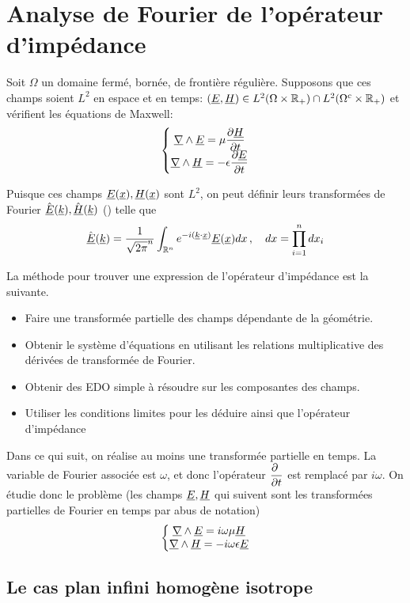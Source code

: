 \section{Analyse de Fourier de l'opérateur d'impédance}
Soit $\Omega$ un domaine fermé, bornée, de frontière régulière. Supposons que ces champs soient $L^2$ en espace et en temps: $(\E,\H) \in L^2(\Omega \times \R_+) \cap L^2(\Omega^c\times\R_+)$ et vérifient les équations de Maxwell:
\[
    \left\lbrace 
    \begin{matrix}
    \rot \E = \mu \dr{t}{\H} \\
    \rot \H = -\eps \dr{t}{\E}
    \end{matrix}
    \right.
\]

Puisque ces champs $\E(\v{x}),\H(\v{x})$ sont $L^2$, on peut définir leurs transformées de Fourier $\hat{\E}(\v{k}), \hat{\H}(\v{k})$ (\cite[Théorème de Plancherel, p.~153]{yosida_functional_1995}) telle que
\[
    \hat{\E} (\v{k}) = \frac{1}{\sqrt{2\pi}^n}\int_{\R^n} e^{-i(\v{k} \cdot \v{x})}\E(\v{x}) dx\,, \quad dx = \prod\limits_{i=1}^n dx_i
\]

La méthode pour trouver une expression de l'opérateur d'impédance est la suivante.
\begin{itemize}
\item Faire une transformée partielle des champs dépendante de la géométrie.
\item Obtenir le système d'équations en utilisant les relations multiplicative des dérivées de transformée de Fourier.
\item Obtenir des EDO simple à résoudre sur les composantes des champs.
\item Utiliser les conditions limites pour les déduire ainsi que l'opérateur d'impédance
\end{itemize}

Dans ce qui suit, on réalise au moins une transformée partielle en temps. La variable de Fourier associée est $\omega$, et donc l'opérateur $\dr{t}{~}$ est remplacé par $i\omega$. On étudie donc le problème (les champs $\E,\H$ qui suivent sont les transformées partielles de Fourier en temps par abus de notation)
\[
    \left\lbrace 
    \begin{matrix}
    \rot \E = i \omega \mu \H \\
    \rot \H = -i \omega \eps \E
    \end{matrix}
    \right.
\]
\subsection{Le cas plan infini homogène isotrope}

